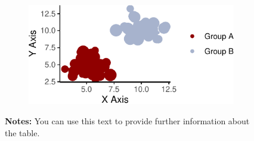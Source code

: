 \documentclass[12pt,a4paper,oneside]{article} %
\begin{document}
\begin{figure}

\caption{\label{fig-scatterplot}Two groups have very different values}

{\centering 

\begin{figure}[H]

{\centering \includegraphics{example_paper_files/figure-pdf/scatterplot-1.pdf}

}

\end{figure}

\hypertarget{fig-scatterplot-1}{}
\vspace{-5pt}
\begin{minipage}{0.9\textwidth}
\scriptsize
\singlespacing
\textbf{Notes:} You can use this text to provide further information about the table. \lipsum[66]
\end{minipage}
\vspace{15pt}

}

\end{figure}

\lipsum[1]
\end{document}
